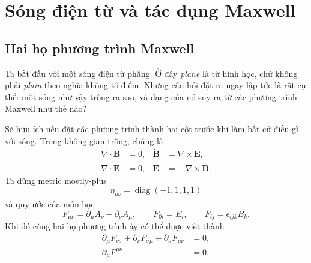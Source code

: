 \chapter{Sóng điện từ và tác dụng Maxwell}


\section{Hai họ phương trình Maxwell}

Ta bắt đầu với một sóng điện từ phẳng. Ở đây \emph{plane} là từ hình học, chứ không phải \emph{plain} theo nghĩa không tô điểm. Những câu hỏi đặt ra ngay lập tức là rất cụ thể: một sóng như vậy trông ra sao, và dạng của nó suy ra từ các phương trình Maxwell như thế nào?

Sẽ hữu ích nếu đặt các phương trình thành hai cột trước khi làm bất cứ điều gì với sóng. Trong không gian trống, chúng là
\begin{align}
\nabla\cdot\mathbf B&=0,
&
\dot{\mathbf B}&=\nabla\times\mathbf E,
\label{eq:homogeneous-vector}
\\
\nabla\cdot\mathbf E&=0,
&
\dot{\mathbf E}&=-\,\nabla\times\mathbf B.
\label{eq:dynamical-vector-vacuum}
\end{align}
Ta dùng metric mostly-plus
\begin{equation}
\eta_{\mu\nu}=\operatorname{diag}(-1,1,1,1)
\end{equation}
và quy ước của môn học
\begin{equation}
F_{\mu\nu}
=
\partial_\mu A_\nu-\partial_\nu A_\mu,
\qquad
F_{0i}=E_i,
\qquad
F_{ij}=\epsilon_{ijk}B_k.
\label{eq:course-f-convention}
\end{equation}
Khi đó cùng hai họ phương trình ấy có thể được viết thành
\begin{align}
\partial_\mu F_{\nu\sigma}
+\partial_\nu F_{\sigma\mu}
+\partial_\sigma F_{\mu\nu}
&=0,
\label{eq:bianchi-l9}
\\
\partial_\mu F^{\mu\nu}
&=0.
\label{eq:vacuum-maxwell-covariant}
\end{align}

